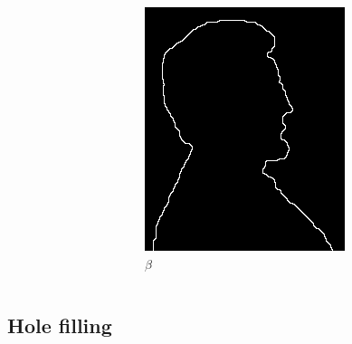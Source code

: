 \begin{frame}
\begin{columns}
\begin{column}{.33\textwidth}
\end{column}
\begin{column}{.33\textwidth}
\begin{figure}
\centering
\includegraphics[width=.6\textwidth]{beta.png}
\caption{$\beta$}
\end{figure}
\end{column}
\end{columns}
\end{frame}

\subsection{Hole filling}

